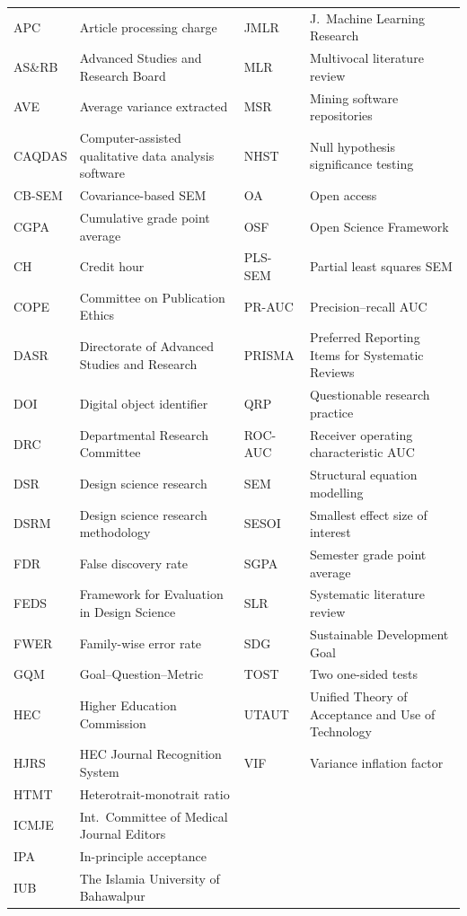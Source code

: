 \begin{center}
\small
\begin{tabular}{@{}L{2.4cm}L{5.0cm}L{2.4cm}L{4.2cm}@{}}
\toprule
APC   & Article processing charge      & JMLR  & J.\ Machine Learning Research \\
AS\&RB & Advanced Studies and Research Board & MLR & Multivocal literature review \\
AVE   & Average variance extracted     & MSR   & Mining software repositories \\
CAQDAS & Computer-assisted qualitative data analysis software & NHST & Null hypothesis significance testing \\
CB-SEM & Covariance-based SEM          & OA    & Open access \\
CGPA  & Cumulative grade point average & OSF   & Open Science Framework \\
CH    & Credit hour                    & PLS-SEM & Partial least squares SEM \\
COPE  & Committee on Publication Ethics & PR-AUC & Precision--recall AUC \\
DASR  & Directorate of Advanced Studies and Research & PRISMA & Preferred Reporting Items for Systematic Reviews \\
DOI   & Digital object identifier      & QRP   & Questionable research practice \\
DRC   & Departmental Research Committee & ROC-AUC & Receiver operating characteristic AUC \\
DSR   & Design science research        & SEM   & Structural equation modelling \\
DSRM  & Design science research methodology & SESOI & Smallest effect size of interest \\
FDR   & False discovery rate           & SGPA  & Semester grade point average \\
FEDS  & Framework for Evaluation in Design Science & SLR & Systematic literature review \\
FWER  & Family-wise error rate         & SDG   & Sustainable Development Goal \\
GQM   & Goal--Question--Metric         & TOST  & Two one-sided tests \\
HEC   & Higher Education Commission    & UTAUT & Unified Theory of Acceptance and Use of Technology \\
HJRS  & HEC Journal Recognition System & VIF   & Variance inflation factor \\
HTMT  & Heterotrait-monotrait ratio    & &  \\
ICMJE & Int.\ Committee of Medical Journal Editors & & \\
IPA   & In-principle acceptance        & & \\
IUB   & The Islamia University of Bahawalpur & & \\
\bottomrule
\end{tabular}
\end{center}

